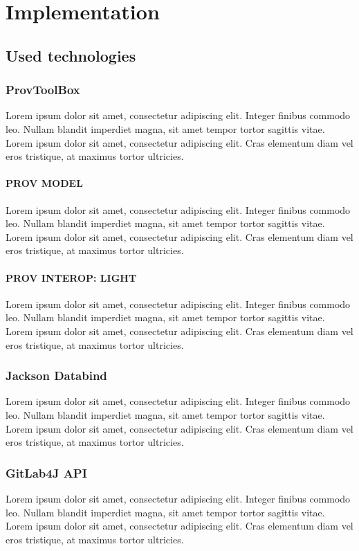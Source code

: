 \documentclass[
  digital,     %
  oneside,     %
  nosansbold,  %
  nocolorbold, %
  lof,         %
  lot,         %
]{fithesis4}
\begin{document}
\chapter{Implementation}
\section{Used technologies}
\shorthandoff{-}
\subsection{ProvToolBox}
Lorem ipsum dolor sit amet, consectetur adipiscing elit. Integer finibus commodo leo. Nullam blandit imperdiet magna, sit amet tempor tortor sagittis vitae. Lorem ipsum dolor sit amet, consectetur adipiscing elit. Cras elementum diam vel eros tristique, at maximus tortor ultricies.

\subsubsection{PROV MODEL}
Lorem ipsum dolor sit amet, consectetur adipiscing elit. Integer finibus commodo leo. Nullam blandit imperdiet magna, sit amet tempor tortor sagittis vitae. Lorem ipsum dolor sit amet, consectetur adipiscing elit. Cras elementum diam vel eros tristique, at maximus tortor ultricies.

\subsubsection{PROV INTEROP: LIGHT}
Lorem ipsum dolor sit amet, consectetur adipiscing elit. Integer finibus commodo leo. Nullam blandit imperdiet magna, sit amet tempor tortor sagittis vitae. Lorem ipsum dolor sit amet, consectetur adipiscing elit. Cras elementum diam vel eros tristique, at maximus tortor ultricies.

\subsection{Jackson Databind}
Lorem ipsum dolor sit amet, consectetur adipiscing elit. Integer finibus commodo leo. Nullam blandit imperdiet magna, sit amet tempor tortor sagittis vitae. Lorem ipsum dolor sit amet, consectetur adipiscing elit. Cras elementum diam vel eros tristique, at maximus tortor ultricies.

\subsection{GitLab4J API}
Lorem ipsum dolor sit amet, consectetur adipiscing elit. Integer finibus commodo leo. Nullam blandit imperdiet magna, sit amet tempor tortor sagittis vitae. Lorem ipsum dolor sit amet, consectetur adipiscing elit. Cras elementum diam vel eros tristique, at maximus tortor ultricies.
\end{document}
